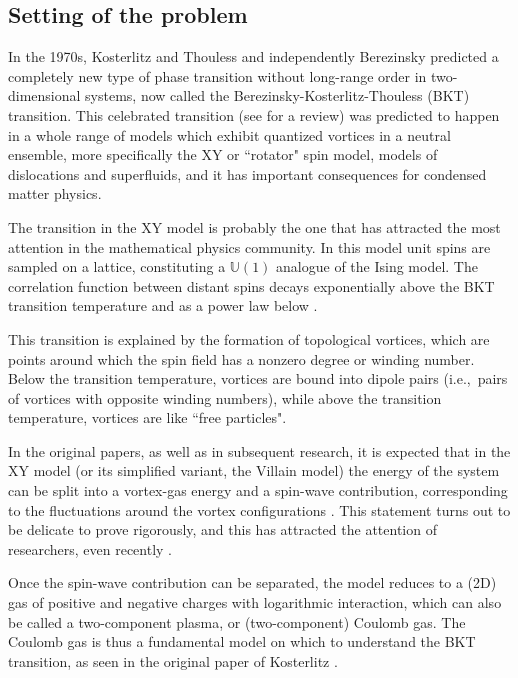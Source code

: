 \documentclass[a4paper,10pt,leqno]{amsart}
\numberwithin{equation}{section}
\begin{document}
\subsection{Setting of the problem}
In the 1970s, Kosterlitz and Thouless \cite{Kosterlitz1974,Kosterlitz1973} and independently Berezinsky \cite{Berezinsky1970fr} predicted a completely new type of phase transition without long-range order in two-dimensional systems, now called the Berezinsky-Kosterlitz-Thouless (BKT) transition. This celebrated transition (see \cite{bietenholz2016berezinskii} for a review) was predicted to happen in a whole range of models which exhibit quantized vortices in a neutral ensemble, more specifically the XY or ``rotator" spin model, models of dislocations and superfluids, and it has important consequences for condensed matter physics.

The transition in the XY model is probably the one that has attracted the most attention in the mathematical physics community.
In this model unit spins are sampled on a lattice, constituting a $\mathbb{U}(1)$ analogue of the Ising model. The correlation function between distant spins decays exponentially above the BKT transition temperature and as a power law below \cite{mcbryanspencer,frohlichspencer,mkp1,mkp2,bricmont}.

This transition is explained by the formation of topological vortices, which are points around which the spin field has a nonzero degree or winding number. Below the transition temperature, vortices are bound into dipole pairs (i.e.,~pairs of vortices with opposite winding numbers), while above the transition temperature, vortices are like ``free particles".

In the original papers, as well as in subsequent research, it is expected that in the XY model (or its simplified variant, the Villain model) the energy of the system can be split into a vortex-gas energy and a spin-wave contribution, corresponding to the fluctuations around the vortex configurations \cite{Kosterlitz1974,Kosterlitz1973,kennedy}.
This statement turns out to be delicate to prove rigorously, and this has attracted the attention of researchers, even recently \cite{garban2020statistical,garban2020quantitative}.

Once the spin-wave contribution can be separated, the model reduces to a (2D) gas of positive and negative charges with logarithmic interaction, which can also be called a two-component plasma, or (two-component) Coulomb gas. The Coulomb gas is thus a fundamental model on which to understand the BKT transition, as seen in the original paper of Kosterlitz \cite{Kosterlitz1973}.
\end{document}
